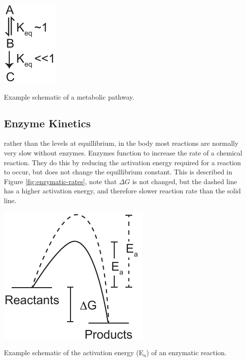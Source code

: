 \documentclass{tufte-handout}
\begin{document}
\begin{marginfigure}
\includegraphics[width=0.5\marginparwidth]{figures/committed-step.pdf}\
\caption{Example schematic of a metabolic pathway.}
\label{fig:committed-step}
\end{marginfigure}

\subsection{Enzyme Kinetics}

 rather than the levels at equillibrium, in the body most reactions are normally very slow without enzymes.  Enzymes function to increase the rate of a chemical reaction.  They do this by reducing the activation energy required for a reaction to occur, but does not change the equillibrium constant.  This is described in Figure \ref{fig:enzymatic-rates}, note that $\Delta G$ is not changed, but the dashed line has a higher activation energy, and therefore slower reaction rate than the solid line.  

\begin{marginfigure}
\includegraphics[width=\marginparwidth]{figures/enzymatic-rates.pdf}\
\caption{Example schematic of the activation energy (E$_a$) of an enzymatic reaction.}
\label{fig:enzymatic-rates}
\end{marginfigure}
\end{document}
